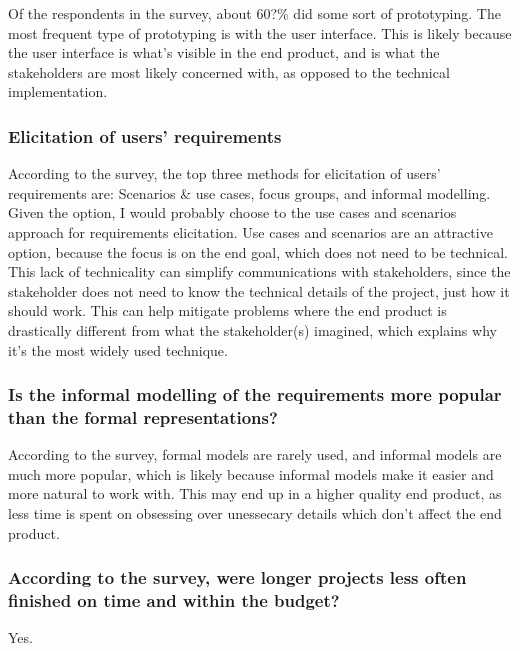 \documentclass[letterpaper,12pt]{article}
\begin{document}
Of the respondents in the survey, about 60?\% did some sort of prototyping.
The most frequent type of prototyping is with the user interface. This is likely
because the user interface is what's visible in the end product, and is what the
stakeholders are most likely concerned with, as opposed to the technical implementation.
\subsubsection{Elicitation of users' requirements}

According to the survey, the top three methods for
elicitation of users’ requirements are: Scenarios \& use cases, focus groups, and informal modelling.
Given the option, I would probably choose to the use cases and scenarios approach for requirements
elicitation. Use cases and scenarios are an attractive option, because the focus is on the end goal,
which does not need to be technical. This lack of technicality can simplify communications with stakeholders,
since the stakeholder does not need to know the technical details of the project, just how it should work.
This can help mitigate problems where the end product is drastically different from what the stakeholder(s)
imagined, which explains why it's the most widely used technique.

\subsubsection{Is the informal modelling of the requirements more
 popular than the formal representations?}

According to the survey, formal models are rarely used, and informal models are
much more popular, which is likely because informal models make it easier and more
natural to work with. This may end up in a higher quality end product, as less time
is spent on obsessing over unessecary details which don't affect the end product.
\subsubsection{According to the survey, were longer projects less often finished on
 time and within the budget?}
Yes.
\end{document}
